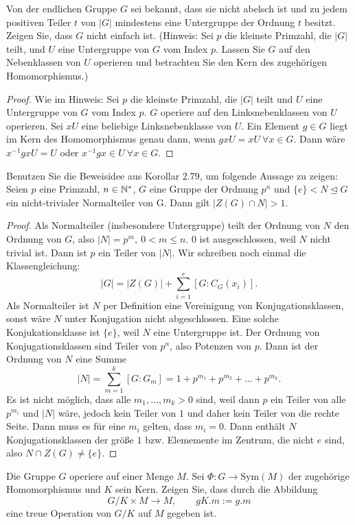 \begin{Problem}
Von der endlichen Gruppe $G$ sei bekannt, dass sie nicht abelsch ist und zu jedem positiven Teiler $t$ von $|G|$ mindestens eine Untergruppe der Ordnung $t$ besitzt. Zeigen Sie, dass $G$ nicht einfach ist. (Hinweis: Sei $p$ die kleinste Primzahl, die $|G|$ teilt, und $U$ eine Untergruppe von $G$ vom Index $p$. Lassen Sie $G$ auf den Nebenklassen von $U$ operieren und betrachten Sie den Kern des zugehörigen Homomorphismus.)	
\end{Problem}
\begin{proof}
	Wie im Hinweis: Sei $p$ die kleinste Primzahl, die $|G|$ teilt und $U$ eine Untergruppe von $G$ vom Index $p$. $G$ operiere auf den Linksnebenklassen von $U$ operieren. Sei $xU$ eine beliebige Linksnebenklasse von $U$. Ein Element $g\in G$ liegt im Kern des Homomorphismus genau dann, wenn $gxU=xU~\forall x\in G$. Dann wäre $x^{-1}gxU=U$ oder $x^{-1}gx\in U~\forall x\in G$.
\end{proof}
\begin{Problem}
Benutzen Sie die Beweisidee aus Korollar 2.79, um folgende Aussage zu zeigen: Seien $p$ eine Primzahl, $n \in \mathbb{N}^*$, $G$ eine Gruppe der Ordnung $p^n$ und $\{e\} < N \trianglelefteq G$ ein nicht-trivialer Normalteiler von G. Dann gilt $|Z(G) \cap N| > 1$.	
\end{Problem}
\begin{proof}
	Als Normalteiler (insbesondere Untergruppe) teilt der Ordnung von $N$ den Ordnung von $G$, also $|N|=p^m,~0<m\le n$. $0$ ist ausgeschlossen, weil $N$ nicht trivial ist. Dann ist $p$ ein Teiler von $|N|$. Wir schreiben noch einmal die Klassengleichung:
	\[
	|G|=|Z(G)|+\sum_{i=1}^r [G:C_G(x_i)]
	.\] 
	Als Normalteiler ist $N$ per Definition eine Vereinigung von Konjugationsklassen, sonst wäre $N$ unter Konjugation nicht abgeschlossen. Eine solche Konjukationsklasse ist $\{e\} $, weil $N$ eine Untergruppe ist. Der Ordnung von Konjugationsklassen sind Teiler von $p^n$, also Potenzen von $p$. Dann ist der Ordnung von $N$ eine Summe
	\[
		|N|=\sum_{m=1}^k [G:G_m]=1+p^{m_1}+p^{m_2}+\dots+p^{m_k}
	.\] 
	Es ist nicht möglich, dass alle $m_1,\dots, m_k>0$ sind, weil dann $p$ ein Teiler von alle $p^{m_i}$ und $|N|$ wäre, jedoch kein Teiler von $1$ und daher kein Teiler von die rechte Seite. Dann muss es f\"{u}r eine $m_i$ gelten, dass $m_i=0$. Dann enthält $N$ Konjugationsklassen der größe $1$ bzw. Elememente im Zentrum, die nicht $e$ sind, also $N\cap Z(G)\neq \{e\} $.
\end{proof}
\begin{Problem}
	Die Gruppe $G$ operiere auf einer Menge $M$. Sei $\Phi:G\to \text{Sym}(M)$ der zugehörige Homomorphismus und $K$ sein Kern. Zeigen Sie, dass durch die Abbildung
	\[
G / K \times M \to M,\qquad gK.m:=g.m
\]
eine treue Operation von $G / K$ auf $M$ gegeben ist.
\end{Problem}

